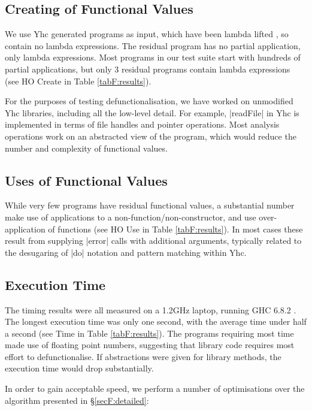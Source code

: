 \subsection{Creating of Functional Values}

We use Yhc generated programs as input, which have been lambda lifted \cite{lambda_lift}, so contain no lambda expressions. The residual program has no partial application, only lambda expressions. Most programs in our test suite start with hundreds of partial applications, but only 3 residual programs contain lambda expressions (see HO Create in Table \ref{tabF:results}).

For the purposes of testing defunctionalisation, we have worked on unmodified Yhc libraries, including all the low-level detail. For example, |readFile| in Yhc is implemented in terms of file handles and pointer operations. Most analysis operations work on an abstracted view of the program, which would reduce the number and complexity of functional values.

\subsection{Uses of Functional Values}

While very few programs have residual functional values, a substantial number make use of applications to a non-function/non-constructor, and use over-application of functions (see HO Use in Table \ref{tabF:results}). In most cases these result from supplying |error| calls with additional arguments, typically related to the desugaring of |do| notation and pattern matching within Yhc.

\subsection{Execution Time}
\label{secF:time}

The timing results were all measured on a 1.2GHz laptop, running GHC 6.8.2 \cite{ghc}. The longest execution time was only one second, with the average time under half a second (see Time in Table \ref{tabF:results}). The programs requiring most time made use of floating point numbers, suggesting that library code requires most effort to defunctionalise. If abstractions were given for library methods, the execution time would drop substantially.

In order to gain acceptable speed, we perform a number of optimisations over the algorithm presented in \S\ref{secF:detailed}:

